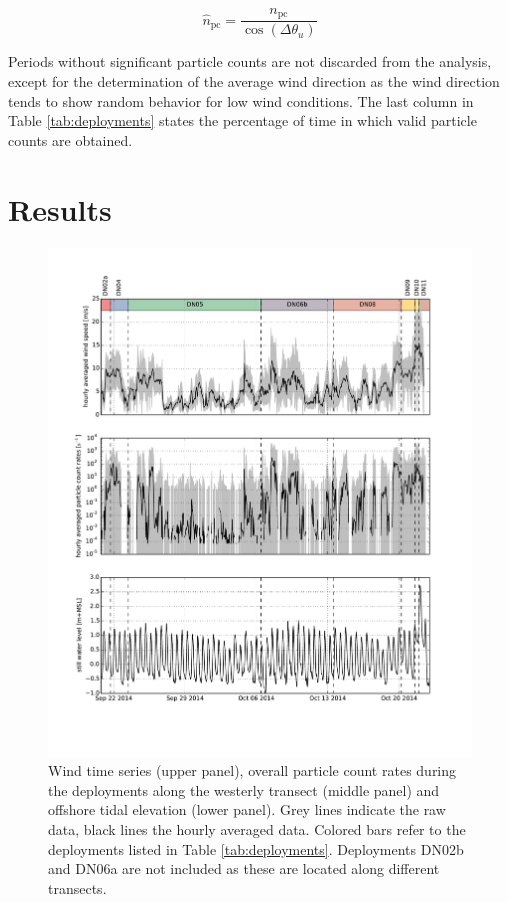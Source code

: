 \begin{equation}
  \hat{n}_{\mathrm{pc}} = \frac{n_{\mathrm{pc}}}{\cos(\Delta \theta_u)}
\end{equation}

Periods without significant particle counts are not discarded from the
analysis, except for the determination of the average wind direction
as the wind direction tends to show random behavior for low wind
conditions. The last column in Table \ref{tab:deployments} states the
percentage of time in which valid particle counts are obtained.

\section{Results}

\begin{figure}
 \centering
  \includegraphics[width=\columnwidth]{../Figures/particlecounts_timeseries}
  \caption{Wind time series (upper panel), overall particle count
    rates during the deployments along the westerly transect (middle
    panel) and offshore tidal elevation (lower panel). Grey lines
    indicate the raw data, black lines the hourly averaged
    data. Colored bars refer to the deployments listed in Table
    \ref{tab:deployments}. Deployments DN02b and DN06a are not
    included as these are located along different transects.}
  \label{fig:pc_timeseries}
\end{figure}

